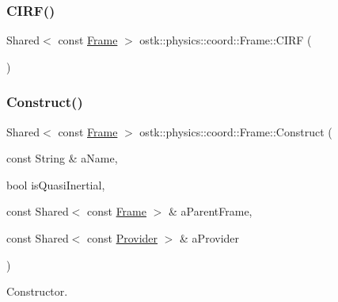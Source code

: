 \mbox{\label{classostk_1_1physics_1_1coord_1_1_frame_ae858400dfa432f12b71712b52b3f5108}} 
\subsubsection{\texorpdfstring{C\+I\+R\+F()}{CIRF()}}
{\footnotesize\ttfamily Shared$<$ const \hyperlink{classostk_1_1physics_1_1coord_1_1_frame}{Frame} $>$ ostk\+::physics\+::coord\+::\+Frame\+::\+C\+I\+RF (\begin{DoxyParamCaption}{ }\end{DoxyParamCaption})\hspace{0.3cm}{\ttfamily [static]}}

\mbox{\label{classostk_1_1physics_1_1coord_1_1_frame_a6faa8908c55e5e56ce3ed4c96d15b9af}} 
\subsubsection{\texorpdfstring{Construct()}{Construct()}}
{\footnotesize\ttfamily Shared$<$ const \hyperlink{classostk_1_1physics_1_1coord_1_1_frame}{Frame} $>$ ostk\+::physics\+::coord\+::\+Frame\+::\+Construct (\begin{DoxyParamCaption}\item[{const String \&}]{a\+Name,  }\item[{bool}]{is\+Quasi\+Inertial,  }\item[{const Shared$<$ const \hyperlink{classostk_1_1physics_1_1coord_1_1_frame}{Frame} $>$ \&}]{a\+Parent\+Frame,  }\item[{const Shared$<$ const \hyperlink{classostk_1_1physics_1_1coord_1_1frame_1_1_provider}{Provider} $>$ \&}]{a\+Provider }\end{DoxyParamCaption})\hspace{0.3cm}{\ttfamily [static]}}



Constructor. 


